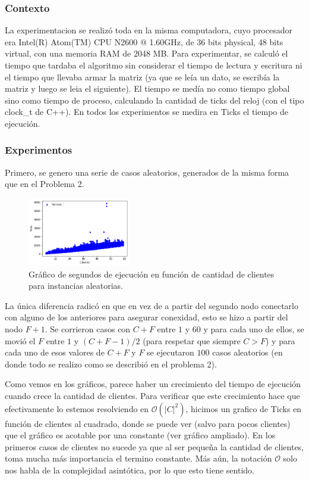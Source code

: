 \documentclass[A4paper,oneside,fleqn,11pt]{article}
\theoremstyle{definition}
\begin{document}
\subsubsection{Contexto}
La experimentacion se realizó toda en la misma computadora, cuyo procesador era Intel(R) Atom(TM) CPU N2600 @ 1.60GHz, de 36 bits physical, 48 bits virtual, con una memoria RAM de 2048 MB.  Para experimentar, se calculó el tiempo que tardaba el algoritmo sin considerar el tiempo de lectura y escritura ni el tiempo que llevaba armar la matriz (ya que se leía un dato, se escribía la matriz y luego se leia el siguiente). 
El tiempo se medía no como tiempo global sino como tiempo de proceso, calculando la cantidad de ticks del reloj (con el tipo clock\_t de C++). En todos los experimentos se medira en Ticks el tiempo de ejecución.
\subsubsection{Experimentos}
Primero, se genero una serie de casos aleatorios, generados de la misma forma que en el Problema 2.
\begin{figure}
\centering
\includegraphics[width=0.4\textwidth]{r1p3.png}
\caption{ Gráfico de segundos de ejecución en función de cantidad de clientes para instancias aleatorias.}
\end{figure}

 La única diferencia radicó en que en vez de a partir del segundo nodo conectarlo con alguno de los anteriores para asegurar conexidad, esto se hizo a partir del nodo $F+1$. Se corrieron casos con $C+F$ entre $1$ y $60$ y para cada uno de ellos, se movió el $F$ entre $1$ y $(C+F-1)/2$ (para respetar que siempre $C>F$) y para cada uno de esos valores de $C+F$ y $F$ se ejecutaron $100$ casos aleatorios (en donde todo se realizo como se describió en el problema 2).

Como vemos en los gráficos, parece haber un crecimiento del tiempo de ejecución cuando crece la cantidad de clientes. Para verificar que este crecimiento hace que efectivamente lo estemos resolviendo en $\mathcal{O}(|C|^2)$, hicimos un grafico de Ticks en función de clientes al cuadrado, donde se puede ver (salvo para pocos clientes) que el gráfico es acotable por una constante (ver gráfico ampliado). En los primeros casos de clientes no sucede ya que al ser pequeña la cantidad de clientes, toma mucha más importancia el termino constante. Más aún, la notación $\mathcal{O}$ solo nos habla de la complejidad asintótica, por lo que esto tiene sentido. 
\end{document}
